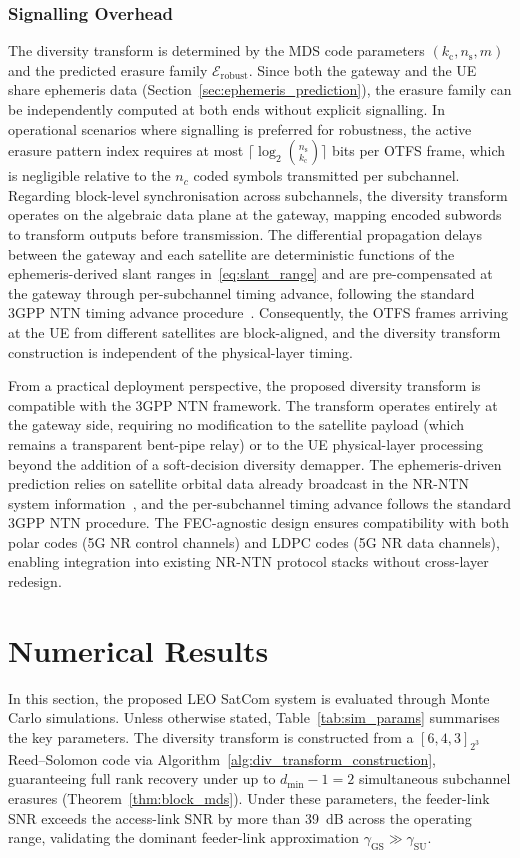 \documentclass[journal]{IEEEtran}
\begin{document}
\subsubsection{Signalling Overhead}
The diversity transform is determined by the MDS code parameters
$(k_{\mathrm{c}}, n_{\mathrm{s}}, m)$ and the predicted erasure
family $\mathcal{E}_{\mathrm{robust}}$. Since both the gateway
and the UE share ephemeris data
(Section~\ref{sec:ephemeris_prediction}), the erasure family can
be independently computed at both ends without explicit signalling.
In operational scenarios where signalling is preferred for
robustness, the active erasure pattern index requires at most
$\lceil\log_2\binom{n_{\mathrm{s}}}{k_{\mathrm{c}}}\rceil$ bits
per OTFS frame, which is negligible relative to the $n_c$ coded
symbols transmitted per subchannel.
Regarding block-level synchronisation across subchannels, the
diversity transform operates on the algebraic data plane at the
gateway, mapping encoded subwords to transform outputs before
transmission. The differential propagation delays between the
gateway and each satellite are deterministic functions of the
ephemeris-derived slant ranges in~\eqref{eq:slant_range} and are
pre-compensated at the gateway through per-subchannel timing
advance, following the standard 3GPP NTN timing advance
procedure~\cite{3GPP38821}. Consequently, the OTFS frames
arriving at the UE from different satellites are block-aligned,
and the diversity transform construction is independent of the
physical-layer timing.

From a practical deployment perspective, the proposed diversity transform is compatible with the 3GPP NTN framework. The transform operates entirely at the gateway side, requiring no modification to the satellite payload (which remains a transparent bent-pipe relay) or to the UE physical-layer processing beyond the addition of a soft-decision diversity demapper. The ephemeris-driven prediction relies on satellite orbital data already broadcast in the NR-NTN system information~\cite{3GPP38821}, and the per-subchannel timing advance follows the standard 3GPP NTN procedure. The FEC-agnostic design ensures compatibility with both polar codes (5G NR control channels) and LDPC codes (5G NR data channels), enabling integration into existing NR-NTN protocol stacks without cross-layer redesign.

\section{Numerical Results}
\label{sec:results}
In this section, the proposed LEO SatCom system is evaluated through Monte Carlo
  simulations. Unless otherwise stated, Table~\ref{tab:sim_params}
  summarises the key parameters. The diversity transform is
  constructed from a $[6, 4, 3]_{2^3}$ Reed--Solomon code via
  Algorithm~\ref{alg:div_transform_construction}, guaranteeing
  full rank recovery under up to $d_{\min} - 1 = 2$ simultaneous
  subchannel erasures (Theorem~\ref{thm:block_mds}). Under these
  parameters, the feeder-link SNR exceeds the access-link SNR by
  more than 39~dB across the operating range, validating the
  dominant feeder-link approximation
  $\gamma_{\mathrm{GS}} \gg \gamma_{\mathrm{SU}}$.
\end{document}
